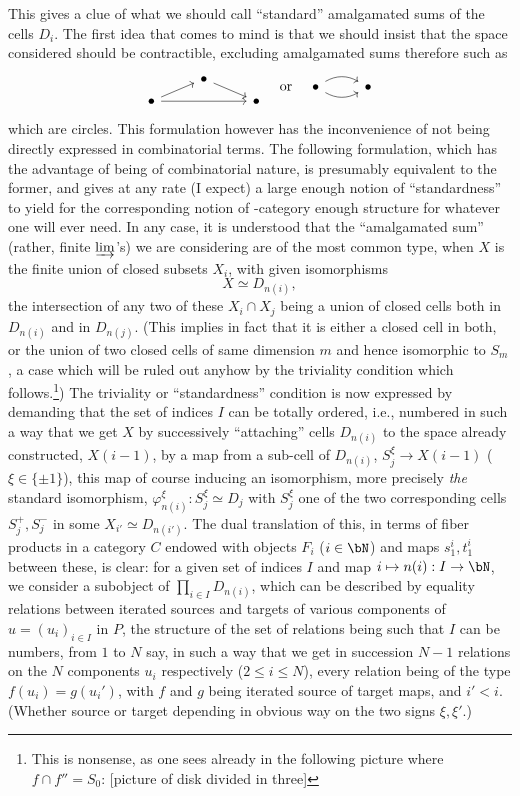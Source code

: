This gives a clue of what we should call ``standard'' amalgamated sums
of the cells $D_i$. The first idea that comes to mind is that we
should insist that the space considered should be contractible,
excluding amalgamated sums therefore such as
\[
\begin{tikzcd}[row sep=tiny]
  & \bullet \ar[dr] \\ \bullet \ar[ur] \ar[rr] & & \bullet
\end{tikzcd} \quad\text{or}\quad
\begin{tikzcd}
  \bullet \ar[r, bend left] \ar[r, bend right] & \bullet
\end{tikzcd}\]
which are circles. This formulation however has the inconvenience of
not being directly expressed in combinatorial terms. The following
formulation, which has the advantage of being of combinatorial nature,
is presumably equivalent to the former, and gives at any rate (I expect) a large
enough notion of ``standardness'' to yield for the corresponding
notion of \oo-category enough structure for whatever one will ever
need. In any case, it is understood that the ``amalgamated
sum'' (rather, finite $\varinjlim$'s) we are considering are of the most
common type, when $X$ is the finite union of closed subsets $X_i$,
with given isomorphisms
\[ X \simeq  D_{n(i)},\]
the intersection of any two of these $X_i\cap X_j$ being a union of
closed cells both in $D_{n(i)}$ and in $D_{n(j)}$. (This implies in
fact that it is either a closed cell in both, or the union of two
closed cells of same dimension $m$ and hence isomorphic to $S_m$, a
case which will be ruled out anyhow by the triviality condition which
follows.\footnote{This is nonsense, as one sees already in the following picture where $f \cap f'' = S_0$: [picture of disk divided in three]}) The
triviality or ``standardness'' condition is now expressed by demanding
that the set of indices $I$ can be totally ordered, i.e., numbered in
such a way that we get $X$ by successively ``attaching'' cells
$D_{n(i)}$ to the space already constructed, $X(i-1)$, by a map from a
sub-cell of $D_{n(i)}$, $S_j^\xi \to X(i-1)$ ($\xi\in\{\pm1\}$), this
map of course inducing an isomorphism, more precisely \emph{the}
standard isomorphism, $\varphi_{n(i)}^\xi : S_j^\xi \simeq  D_j$ with
$S_j^\xi$ one of the two corresponding cells $S_j^+, S_j^-$ in some
$X_{i'}\simeq  D_{n(i')}$. The dual translation of this, in terms of
fiber products in a category $C$ endowed with objects $F_i$
($i\in\bN$) and maps $s_1^i,t_1^i$ between these, is clear: for a
given set of indices $I$ and map $i\mapsto n(i) : I \to \bN$, we
consider a subobject of $\prod_{i\in I} D_{n(i)}$, which can be
described by equality relations between iterated sources and targets
of various components of $u=(u_i)_{i\in I}$ in $P$, the structure of
the set of relations being such that $I$ can be numbers, from $1$ to
$N$ say, in such a way that we get in succession $N-1$ relations on
the $N$ components $u_i$ respectively ($2\le i\le N$), every relation
being of the type $f(u_i) = g(u_i')$, with $f$ and $g$ being iterated
source of target maps, and $i'<i$. (Whether source or target depending
in obvious way on the two signs $\xi,\xi'$.)

